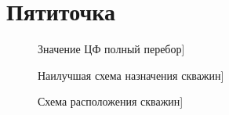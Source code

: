 \documentclass[14pt]{article}
\begin{document}
	\section{Пятиточка}
	\begin{figure}
		\caption{Значение ЦФ полный перебор]}
		\label{fig:map}
	\end{figure}
	\begin{figure}
		\caption{Наилучшая схема назначения скважин]}
		\label{fig:map}
	\end{figure}
	\begin{figure}
		\caption{Схема расположения скважин]}
		\label{fig:map}
	\end{figure}
	
\end{document}
